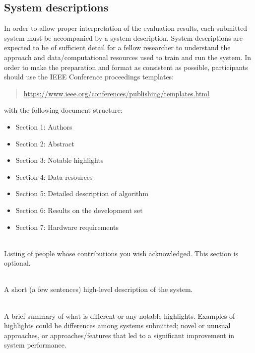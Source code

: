 \documentclass{article}
\begin{document}
\begin{appendices}
\newpage
\section{System descriptions}
\label{app:system}
In order to allow proper interpretation of the evaluation results, each submitted system must be accompanied by a system description. System descriptions are expected to be of sufficient detail for a fellow researcher to understand the approach and data/computational resources used to train and run the system. In order to make the preparation and format as consistent as possible, participants should use the IEEE Conference proceedings templates:
    \begin{quote}
        \url{https://www.ieee.org/conferences/publishing/templates.html}
    \end{quote}
    
with the following document structure:

\begin{itemize}
    \item Section 1: Authors
    \item Section 2: Abstract
    \item Section 3: Notable highlights
    \item Section 4: Data resources
    \item Section 5: Detailed description of algorithm
    \item Section 6: Results on the development set
    \item Section 7: Hardware requirements
\end{itemize}


\vspace{0.5cm}
 \\
Listing of people whose contributions you wish acknowledged. This section is optional.

\vspace{0.5cm}
 \\
A short (a few sentences) high-level description of the system.

\vspace{0.5cm}
 \\
A brief summary of what is different or any notable highlights. Examples of highlights could be differences among systems submitted; novel or unusual approaches, or approaches/features that led to a significant improvement in system performance.



\end{appendices}
\end{document}
